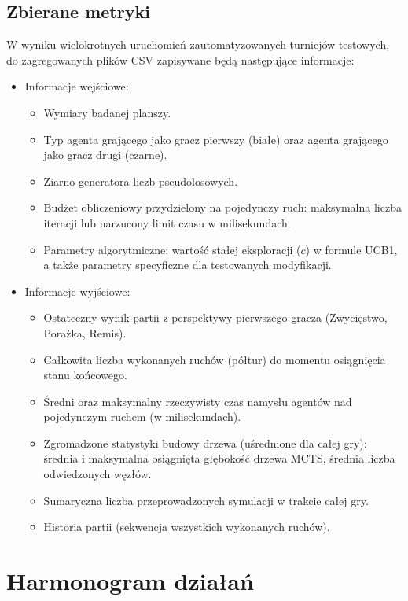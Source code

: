 \documentclass{article}
\begin{document}
\subsection{Zbierane metryki}
\label{ssec:zbierane_metryki}

W wyniku wielokrotnych uruchomień zautomatyzowanych turniejów testowych, do zagregowanych plików CSV zapisywane będą następujące informacje:

\begin{itemize}
    \item Informacje wejściowe:
    \begin{itemize}
        \item Wymiary badanej planszy.
        \item Typ agenta grającego jako gracz pierwszy (białe) oraz agenta grającego jako gracz drugi (czarne).
        \item Ziarno generatora liczb pseudolosowych.
        \item Budżet obliczeniowy przydzielony na pojedynczy ruch: maksymalna liczba iteracji lub narzucony limit czasu w milisekundach.
        \item Parametry algorytmiczne: wartość stałej eksploracji ($c$) w formule UCB1, a także parametry specyficzne dla testowanych modyfikacji.
    \end{itemize}
    \item Informacje wyjściowe:
    \begin{itemize}
        \item Ostateczny wynik partii z perspektywy pierwszego gracza (Zwycięstwo, Porażka, Remis).
        \item Całkowita liczba wykonanych ruchów (półtur) do momentu osiągnięcia stanu końcowego.
        \item Średni oraz maksymalny rzeczywisty czas namysłu agentów nad pojedynczym ruchem (w milisekundach).
        \item Zgromadzone statystyki budowy drzewa (uśrednione dla całej gry): średnia i maksymalna osiągnięta głębokość drzewa MCTS, średnia liczba odwiedzonych węzłów.
        \item Sumaryczna liczba przeprowadzonych symulacji w trakcie całej gry.
        \item Historia partii (sekwencja wszystkich wykonanych ruchów).
    \end{itemize}
\end{itemize}

\section{Harmonogram działań}
\end{document}
